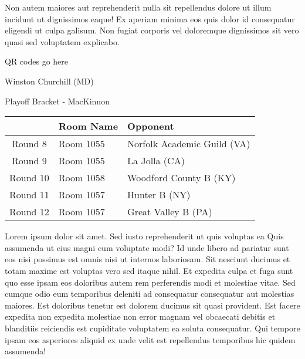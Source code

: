 \documentclass{article}%
\begin{document}
\newline%
Non autem maiores aut reprehenderit nulla sit repellendus dolore ut illum incidunt ut dignissimos eaque! Ex aperiam minima eos quis dolor id consequatur eligendi ut culpa galisum. Non fugiat corporis vel doloremque dignissimos sit vero quasi sed voluptatem explicabo.\newline%
\newline%
%
\vspace*{30pt}%
\begin{center}%
\begin{Huge}%
QR codes go here%
\end{Huge}%
\end{center}%
\newpage%
\begin{center}%
\begin{Huge}%
Winston Churchill (MD)%
\end{Huge}%
\vspace*{8pt}%
\linebreak%
\begin{Large}%
Playoff Bracket {-} MacKinnon%
\end{Large}%
\end{center}%
\begin{tabularx}{\textwidth}{|c|Y|Y|}%
\hline%
&Room Name&Opponent\\%
\hline%
Round 8&Room 1055&Norfolk Academic Guild (VA)\\%
Round 9&Room 1055&La Jolla (CA)\\%
Round 10&Room 1058&Woodford County B (KY)\\%
Round 11&Room 1057&Hunter B (NY)\\%
Round 12&Room 1057&Great Valley B (PA)\\%
\hline%
\end{tabularx}%
\vspace*{8pt}%
\linebreak%
\newline%
\newline%
Lorem ipsum dolor sit amet. Sed iusto reprehenderit ut quis voluptas ea Quis assumenda ut eius magni eum voluptate modi? Id unde libero ad pariatur sunt eos nisi possimus est omnis nisi ut internos laboriosam. Sit nesciunt ducimus et totam maxime est voluptas vero sed itaque nihil. Et expedita culpa et fuga sunt quo esse ipsam eos doloribus autem rem perferendis modi et molestiae vitae.\newline%
\newline%
Sed cumque odio eum temporibus deleniti ad consequatur consequatur aut molestias maiores. Est doloribus tenetur est dolorem ducimus sit quasi provident. Est facere expedita non expedita molestiae non error magnam vel obcaecati debitis et blanditiis reiciendis est cupiditate voluptatem ea soluta consequatur. Qui tempore ipsam eos asperiores aliquid ex unde velit est repellendus temporibus hic quidem assumenda!\newline%
\end{document}
